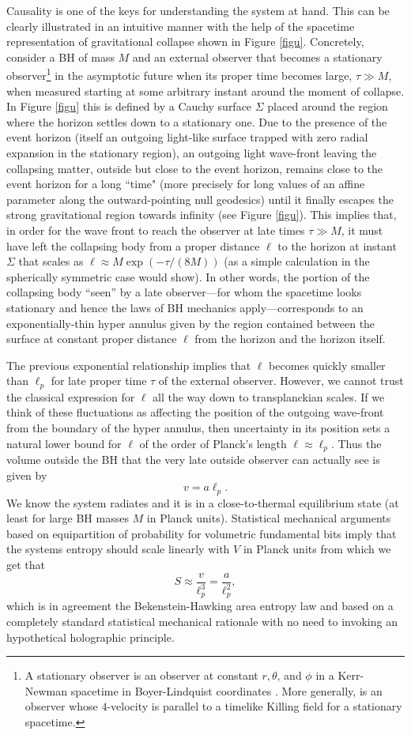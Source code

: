 \documentclass[aps, nofootinbib,superscriptaddress,12pt]{revtex4-2}
\def\be{\begin{equation}}
\def\ee{\end{equation}}
\begin{document}
Causality is one of the keys for understanding the system at hand. This can be clearly illustrated in an intuitive manner with the help of the spacetime representation of gravitational collapse shown in Figure \ref{figu}. Concretely,  consider a BH of mass $M$ and an external observer that becomes a stationary observer\footnote{A stationary observer is an observer at constant $r,\theta$, and $\phi$ in a Kerr-Newman spacetime in Boyer-Lindquist coordinates \cite{wald}. More generally, is an observer whose $4$-velocity is parallel to a timelike Killing field for a stationary spacetime. } in the asymptotic future when its proper time becomes large, $\tau\gg M$, when measured starting at some arbitrary instant around the moment of collapse. In Figure \ref{figu} this is defined by a Cauchy surface $\Sigma$ placed around the region where the horizon settles down to a stationary one. Due to the presence of the event horizon (itself an outgoing light-like surface trapped with zero radial expansion in the stationary region), an outgoing light wave-front leaving the collapsing matter, outside but close to the event horizon, remains close to the event horizon for a long ``time" (more precisely for long values of an affine parameter along the outward-pointing null geodesics) until it finally escapes the strong gravitational region towards infinity (see Figure \ref{figu}). This implies that, in order for the wave front to reach the observer at late times $\tau\gg M$, it must have left the collapsing body from a proper distance $\ell$ to the horizon at instant $\Sigma$ that scales as $\ell\approx M \exp(-\tau/(8M))$ (as a simple calculation in the spherically symmetric case would show). In other words, the portion of the collapsing body ``seen'' by a late observer---for whom the spacetime looks stationary and hence the laws of BH mechanics apply---corresponds to an exponentially-thin hyper annulus given by the region contained between the surface at constant proper distance $\ell$ from the horizon and the horizon itself.  

The previous exponential relationship implies that $\ell$ becomes quickly smaller than $\ell_p$ for late proper time $\tau$ of the external observer. However,  we cannot trust the classical expression for $\ell$ all the way down to transplanckian scales. If we think of these fluctuations as affecting the position of the outgoing wave-front from the boundary of the hyper annulus, then uncertainty in its position sets a natural lower bound for $\ell$ of the order of Planck's length $\ell\approx \ell_p$. Thus the volume outside the BH that  the very late outside observer can actually see is given by
\be
v=a\ell_p.
\ee  
We know the system radiates and it is in a close-to-thermal equilibrium state (at least for large BH masses $M$ in Planck units). Statistical mechanical arguments based on equipartition of probability for volumetric fundamental bits imply that the systems entropy should scale linearly with $V$ in Planck units from which we get that 
\be S\approx \frac{v}{\ell_p^3}=\frac{a}{\ell_p^2}, \ee
which is in agreement the Bekenstein-Hawking area entropy law and based on a completely standard statistical mechanical 
rationale with no need to invoking an hypothetical holographic principle.  
\end{document}
